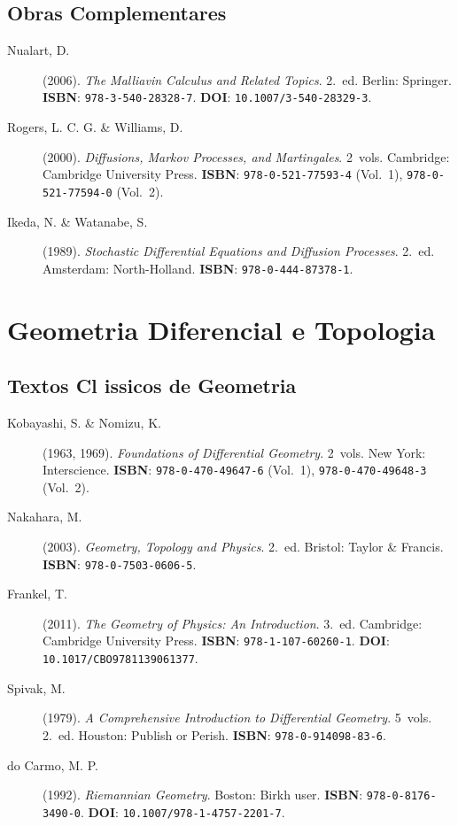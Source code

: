 \subsection{Obras Complementares}

\begin{description}
\item[Nualart, D.] (2006). \textit{The Malliavin Calculus and Related Topics}. 2.~ed. Berlin: Springer. \textbf{ISBN}: \texttt{978-3-540-28328-7}. \textbf{DOI}: \texttt{10.1007/3-540-28329-3}.

\item[Rogers, L. C. G. \& Williams, D.] (2000). \textit{Diffusions, Markov Processes, and Martingales}. 2~vols. Cambridge: Cambridge University Press. \textbf{ISBN}: \texttt{978-0-521-77593-4} (Vol.~1), \texttt{978-0-521-77594-0} (Vol.~2).

\item[Ikeda, N. \& Watanabe, S.] (1989). \textit{Stochastic Differential Equations and Diffusion Processes}. 2.~ed. Amsterdam: North-Holland. \textbf{ISBN}: \texttt{978-0-444-87378-1}.
\end{description}

\section{Geometria Diferencial e Topologia}
\label{sec:ref_geometria}

\subsection{Textos Cl issicos de Geometria}

\begin{description}
\item[Kobayashi, S. \& Nomizu, K.] (1963, 1969). \textit{Foundations of Differential Geometry}. 2~vols. New York: Interscience. \textbf{ISBN}: \texttt{978-0-470-49647-6} (Vol.~1), \texttt{978-0-470-49648-3} (Vol.~2).

\item[Nakahara, M.] (2003). \textit{Geometry, Topology and Physics}. 2.~ed. Bristol: Taylor \& Francis. \textbf{ISBN}: \texttt{978-0-7503-0606-5}.

\item[Frankel, T.] (2011). \textit{The Geometry of Physics: An Introduction}. 3.~ed. Cambridge: Cambridge University Press. \textbf{ISBN}: \texttt{978-1-107-60260-1}. \textbf{DOI}: \texttt{10.1017/CBO9781139061377}.

\item[Spivak, M.] (1979). \textit{A Comprehensive Introduction to Differential Geometry}. 5~vols. 2.~ed. Houston: Publish or Perish. \textbf{ISBN}: \texttt{978-0-914098-83-6}.

\item[do Carmo, M. P.] (1992). \textit{Riemannian Geometry}. Boston: Birkh user. \textbf{ISBN}: \texttt{978-0-8176-3490-0}. \textbf{DOI}: \texttt{10.1007/978-1-4757-2201-7}.
\end{description}

